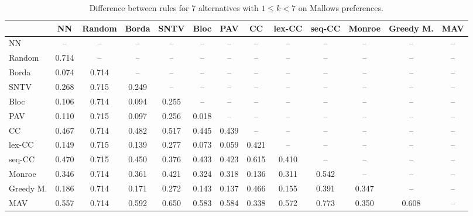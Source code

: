 
\begin{table*}[h!]
\centering
\begin{tabular}{lcccccccccccc}
\toprule
 & NN & Random & Borda & SNTV & Bloc & PAV & CC & lex-CC & seq-CC & Monroe & Greedy M. & MAV \\
\midrule
NN & -- & -- & -- & -- & -- & -- & -- & -- & -- & -- & -- & -- \\
Random & 0.714 & -- & -- & -- & -- & -- & -- & -- & -- & -- & -- & -- \\
Borda & 0.074 & 0.714 & -- & -- & -- & -- & -- & -- & -- & -- & -- & -- \\
SNTV & 0.268 & 0.715 & 0.249 & -- & -- & -- & -- & -- & -- & -- & -- & -- \\
Bloc & 0.106 & 0.714 & 0.094 & 0.255 & -- & -- & -- & -- & -- & -- & -- & -- \\
PAV & 0.110 & 0.715 & 0.097 & 0.256 & 0.018 & -- & -- & -- & -- & -- & -- & -- \\
CC & 0.467 & 0.714 & 0.482 & 0.517 & 0.445 & 0.439 & -- & -- & -- & -- & -- & -- \\
lex-CC & 0.149 & 0.715 & 0.139 & 0.277 & 0.073 & 0.059 & 0.421 & -- & -- & -- & -- & -- \\
seq-CC & 0.470 & 0.715 & 0.450 & 0.376 & 0.433 & 0.423 & 0.615 & 0.410 & -- & -- & -- & -- \\
Monroe & 0.346 & 0.714 & 0.361 & 0.421 & 0.324 & 0.318 & 0.136 & 0.311 & 0.542 & -- & -- & -- \\
Greedy M. & 0.186 & 0.714 & 0.171 & 0.272 & 0.143 & 0.137 & 0.466 & 0.155 & 0.391 & 0.347 & -- & -- \\
MAV & 0.557 & 0.714 & 0.592 & 0.650 & 0.583 & 0.584 & 0.338 & 0.572 & 0.773 & 0.350 & 0.608 & -- \\
\bottomrule
\end{tabular}

\caption{Difference between rules for 7 alternatives with $1 \leq k < 7$ on Mallows preferences.}
\end{table*}

